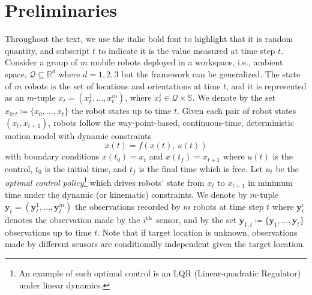 \documentclass[journal]{IEEEtran}
\begin{document}






\section{Preliminaries}
\label{sec:sec2}
Throughout the text, we use the italic bold font to highlight that it is random quantity, and subscript $t$ to indicate it is the value measured at time step $t$.  Consider a group of $m$ mobile robots deployed in a workspace, i.e., ambient space, $\mathcal{Q} \subseteq \mathbb{R}^d$ where $d=1,2,3$ but the framework can be generalized.
The state of $m$ robots is the set of locations and orientations at time $t$, and it is represented as an $m$-tuple $x_t = (x_t^1,\dots,x_t^m)$, where $x_t^i \in \mathcal{Q} \times \mathbb{S}$. We denote by the set  ${x}_{0:t}\coloneqq \lbrace {x}_0,\dots,{x}_t \rbrace$ the robot states up to time $t$. 
Given each pair of robot states $(x_t,x_{t+1})$, robots follow the way-point-based, continuous-time, deterministic motion model with dynamic constraints
\[
\dot{x}(t) = f(x(t),\,u(t))
\]
with boundary conditions $x(t_0) = x_t$ and $x(t_f) = x_{t+1}$ where $u(t)$ is the control, $t_0$ is the initial time, and $t_f$ is the final time which is free. Let $u_t$ be the \emph{optimal control policy}\footnote{An example of such optimal control is an LQR (Linear-quadratic Regulator) under linear dynamics.} which drives robots' state from $x_t$ to $x_{t+1}$ in minimum time under the dynamic (or kinematic) constraints.
We denote by $m$-tuple $\bm{y}_t=(\bm{y}_t^1,\dots,\bm{y}_t^m)$ the observations recorded by $m$ robots at time step $t$ where $\bm{y}_t^i$ denotes the observation made by the $i^{\textup{th}}$ sensor, and by the set $\bm{y}_{1:t}\coloneqq \lbrace \bm{y}_1,\dots,\bm{y}_t \rbrace$ observations up to time $t$. Note that if target location is unknown, observations made by different sensors are conditionally independent given the target location.
\end{document}
